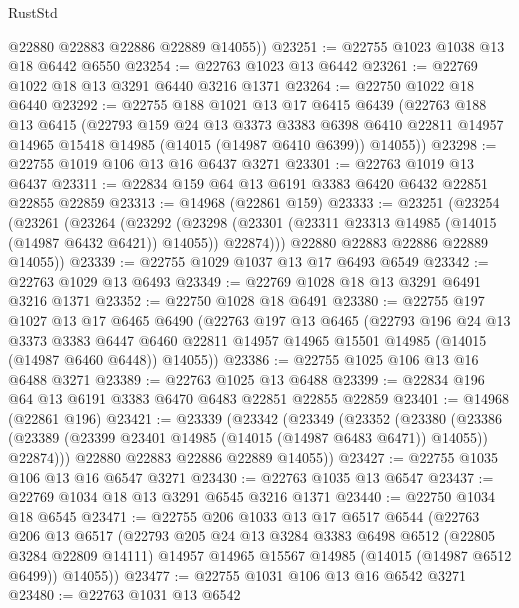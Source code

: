 \begin{lexlean}{RustStd}
\begin{coremodule}
        @22880
        @22883
        @22886
        @22889
        @14055))
@23251 := @22755 @1023 @1038 @13 @18 @6442 @6550
@23254 := @22763 @1023 @13 @6442
@23261 := @22769 @1022 @18 @13 @3291 @6440 @3216 @1371
@23264 := @22750 @1022 @18 @6440
@23292 := @22755
    @188
    @1021
    @13
    @17
    @6415
    @6439
    (@22763
      @188
      @13
      @6415
      (@22793
        @159
        @24
        @13
        @3373
        @3383
        @6398
        @6410
        @22811
        @14957
        @14965
        @15418
        @14985
        (@14015 (@14987 @6410 @6399))
        @14055))
@23298 := @22755 @1019 @106 @13 @16 @6437 @3271
@23301 := @22763 @1019 @13 @6437
@23311 := @22834 @159 @64 @13 @6191 @3383 @6420 @6432 @22851 @22855 @22859
@23313 := @14968 (@22861 @159)
@23333 := @23251
    (@23254
      (@23261
        (@23264
          (@23292
            (@23298 (@23301 (@23311 @23313 @14985 (@14015 (@14987 @6432 @6421)) @14055)) @22874)))
        @22880
        @22883
        @22886
        @22889
        @14055))
@23339 := @22755 @1029 @1037 @13 @17 @6493 @6549
@23342 := @22763 @1029 @13 @6493
@23349 := @22769 @1028 @18 @13 @3291 @6491 @3216 @1371
@23352 := @22750 @1028 @18 @6491
@23380 := @22755
    @197
    @1027
    @13
    @17
    @6465
    @6490
    (@22763
      @197
      @13
      @6465
      (@22793
        @196
        @24
        @13
        @3373
        @3383
        @6447
        @6460
        @22811
        @14957
        @14965
        @15501
        @14985
        (@14015 (@14987 @6460 @6448))
        @14055))
@23386 := @22755 @1025 @106 @13 @16 @6488 @3271
@23389 := @22763 @1025 @13 @6488
@23399 := @22834 @196 @64 @13 @6191 @3383 @6470 @6483 @22851 @22855 @22859
@23401 := @14968 (@22861 @196)
@23421 := @23339
    (@23342
      (@23349
        (@23352
          (@23380
            (@23386 (@23389 (@23399 @23401 @14985 (@14015 (@14987 @6483 @6471)) @14055)) @22874)))
        @22880
        @22883
        @22886
        @22889
        @14055))
@23427 := @22755 @1035 @106 @13 @16 @6547 @3271
@23430 := @22763 @1035 @13 @6547
@23437 := @22769 @1034 @18 @13 @3291 @6545 @3216 @1371
@23440 := @22750 @1034 @18 @6545
@23471 := @22755
    @206
    @1033
    @13
    @17
    @6517
    @6544
    (@22763
      @206
      @13
      @6517
      (@22793
        @205
        @24
        @13
        @3284
        @3383
        @6498
        @6512
        (@22805 @3284 @22809 @14111)
        @14957
        @14965
        @15567
        @14985
        (@14015 (@14987 @6512 @6499))
        @14055))
@23477 := @22755 @1031 @106 @13 @16 @6542 @3271
@23480 := @22763 @1031 @13 @6542

\end{coremodule}
\end{lexlean}

